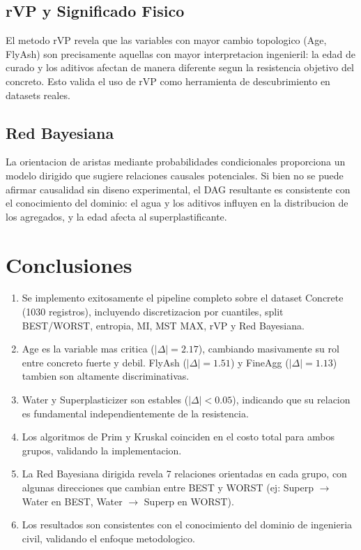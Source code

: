 \documentclass[12pt, a4paper]{article}
\begin{document}
\subsection{rVP y Significado Fisico}

El metodo rVP revela que las variables con mayor cambio topologico (Age,
FlyAsh) son precisamente aquellas con mayor interpretacion ingenieril:
la edad de curado y los aditivos afectan de manera diferente segun la
resistencia objetivo del concreto. Esto valida el uso de rVP como herramienta
de descubrimiento en datasets reales.

\subsection{Red Bayesiana}

La orientacion de aristas mediante probabilidades condicionales proporciona
un modelo dirigido que sugiere relaciones causales potenciales. Si bien no
se puede afirmar causalidad sin diseno experimental, el DAG resultante es
consistente con el conocimiento del dominio: el agua y los aditivos influyen
en la distribucion de los agregados, y la edad afecta al superplastificante.

\section{Conclusiones}

\begin{enumerate}
    \item Se implemento exitosamente el pipeline completo sobre el dataset
          Concrete (1030 registros), incluyendo discretizacion por cuantiles,
          split BEST/WORST, entropia, MI, MST MAX, rVP y Red Bayesiana.

    \item Age es la variable mas critica ($|\Delta|=2.17$), cambiando
          masivamente su rol entre concreto fuerte y debil. FlyAsh
          ($|\Delta|=1.51$) y FineAgg ($|\Delta|=1.13$) tambien son
          altamente discriminativas.

    \item Water y Superplasticizer son estables ($|\Delta|<0.05$), indicando
          que su relacion es fundamental independientemente de la resistencia.

    \item Los algoritmos de Prim y Kruskal coinciden en el costo total para
          ambos grupos, validando la implementacion.

    \item La Red Bayesiana dirigida revela 7 relaciones orientadas en cada
          grupo, con algunas direcciones que cambian entre BEST y WORST
          (ej: Superp $\to$ Water en BEST, Water $\to$ Superp en WORST).

    \item Los resultados son consistentes con el conocimiento del dominio de
          ingenieria civil, validando el enfoque metodologico.
\end{enumerate}
\end{document}
